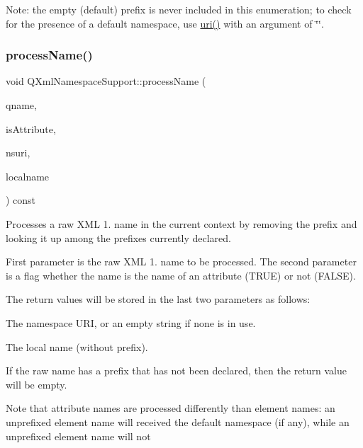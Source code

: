 Note\+: the empty (default) prefix is never included in this enumeration; to check for the presence of a default namespace, use \mbox{\hyperlink{class_q_xml_namespace_support_a6c16aac98314cd385f6442308482ce1b}{uri()}} with an argument of \char`\"{}\char`\"{}. \mbox{\label{class_q_xml_namespace_support_a8480cd143138de4d1ec6dc552fcaf801}} 
\subsubsection{\texorpdfstring{processName()}{processName()}}
{\footnotesize\ttfamily void Q\+Xml\+Namespace\+Support\+::process\+Name (\begin{DoxyParamCaption}\item[{const \mbox{\hyperlink{class_q_string}{Q\+String}} \&}]{qname,  }\item[{bool}]{is\+Attribute,  }\item[{\mbox{\hyperlink{class_q_string}{Q\+String}} \&}]{nsuri,  }\item[{\mbox{\hyperlink{class_q_string}{Q\+String}} \&}]{localname }\end{DoxyParamCaption}) const}

Processes a raw X\+ML 1. name in the current context by removing the prefix and looking it up among the prefixes currently declared.

First parameter is the raw X\+ML 1. name to be processed. The second parameter is a flag whether the name is the name of an attribute (T\+R\+UE) or not (F\+A\+L\+SE).

The return values will be stored in the last two parameters as follows\+: 
\begin{DoxyItemize}
\item The namespace U\+RI, or an empty string if none is in use. 
\item The local name (without prefix). 
\end{DoxyItemize}

If the raw name has a prefix that has not been declared, then the return value will be empty.

Note that attribute names are processed differently than element names\+: an unprefixed element name will received the default namespace (if any), while an unprefixed element name will not \mbox{\label{class_q_xml_namespace_support_a31a7b184ba03b3d61cde7a5def4cff77}} 
